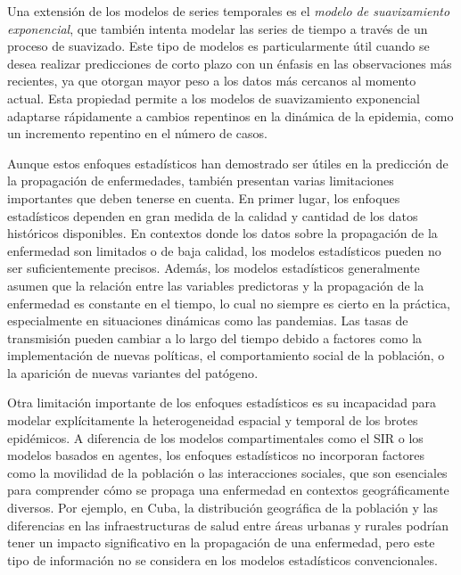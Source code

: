 Una extensión de los modelos de series temporales es el \textit{modelo de suavizamiento exponencial}, que también intenta modelar las series de tiempo a través de un proceso de suavizado. Este tipo de modelos es particularmente útil cuando se desea realizar predicciones de corto plazo con un énfasis en las observaciones más recientes, ya que otorgan mayor peso a los datos más cercanos al momento actual. Esta propiedad permite a los modelos de suavizamiento exponencial adaptarse rápidamente a cambios repentinos en la dinámica de la epidemia, como un incremento repentino en el número de casos\parencite{Shinde2020ForecastingCOVID, LimZohren2020TimeSeries}.

Aunque estos enfoques estadísticos han demostrado ser útiles en la predicción de la propagación de enfermedades, también presentan varias limitaciones importantes que deben tenerse en cuenta. En primer lugar, los enfoques estadísticos dependen en gran medida de la calidad y cantidad de los datos históricos disponibles. En contextos donde los datos sobre la propagación de la enfermedad son limitados o de baja calidad, los modelos estadísticos pueden no ser suficientemente precisos\parencite{Rodriguez2022DataCentric}. Además, los modelos estadísticos generalmente asumen que la relación entre las variables predictoras y la propagación de la enfermedad es constante en el tiempo, lo cual no siempre es cierto en la práctica, especialmente en situaciones dinámicas como las pandemias. Las tasas de transmisión pueden cambiar a lo largo del tiempo debido a factores como la implementación de nuevas políticas, el comportamiento social de la población, o la aparición de nuevas variantes del patógeno\parencite{Moein2021SIRInefficiency}.

Otra limitación importante de los enfoques estadísticos es su incapacidad para modelar explícitamente la heterogeneidad espacial y temporal de los brotes epidémicos. A diferencia de los modelos compartimentales como el SIR o los modelos basados en agentes, los enfoques estadísticos no incorporan factores como la movilidad de la población o las interacciones sociales, que son esenciales para comprender cómo se propaga una enfermedad en contextos geográficamente diversos\parencite{Nowzari2016ComplexNetworks}. Por ejemplo, en Cuba, la distribución geográfica de la población y las diferencias en las infraestructuras de salud entre áreas urbanas y rurales podrían tener un impacto significativo en la propagación de una enfermedad, pero este tipo de información no se considera en los modelos estadísticos convencionales.

